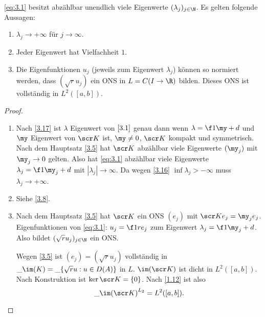 \begin{st} \label{3.19}
	\eqref{eq:3.1} besitzt abzählbar unendlich viele Eigenwerte $(\lambda_j)_{j\in \N}$.
	Es gelten folgende Aussagen:
	\begin{enumerate}[1)]
		\item
			$\lambda_j \to + \infty$ für $j \to \infty$.
		\item
			Jeder Eigenwert hat Vielfachheit $1$.
		\item
			Die Eigenfunktionen $u_j$ (jeweils zum Eigenwert $\lambda_j$) können so normiert werden, dass $(\sqrt {r} u_j)$ ein ONS in $L = C(I \to \R)$ bilden.
			Dieses ONS ist vollständig in $L^2([a,b])$.
	\end{enumerate}
	\begin{proof}
		\begin{enumerate}[1)]
			\item
				Nach \ref{3.17} ist $\lambda$ Eigenwert von $\eqref{3.1}$ genau dann wenn $\lambda = \f 1\my + d$ und $\my$ Eigenwert von $\scr K$ ist, $\my \neq 0$, $\scr K$ kompakt und symmetrisch.
				Nach dem Hauptsatz \ref{3.5} hat $\scr K$ abzählbar viele Eigenwerte $(\my_j)$ mit $\my_j \to 0$ gelten.
				Also hat \eqref{eq:3.1} abzählbar viele Eigenwerte $\lambda_j = \f 1{\my_j} + d$ mit $|\lambda_j| \to \infty$.
				Da wegen \ref{3.16}  $\inf \lambda_j > -\infty$ muss $\lambda_j \to + \infty$.
			\item
				Siehe \ref{3.8}.
			\item
				Nach dem Hauptsatz \ref{3.5} hat $\scr K$ ein ONS $(e_j)$ mit $\scr K e_j = \my_j e_j$.
				Eigenfunktionen von \eqref{eq:3.1}: $u_j = \f 1{r} e_j$ zum Eigenwert $\lambda_j = \f 1{\my_j} + d$.
				Also bildet $(\sqrt{r}u_j)_{j\in \N}$ ein ONS.

				Wegen \ref{3.5} ist $(e_j) = (\sqrt{r} u_j)$ vollständig in $\_{\im (K)} = \_{\{\sqrt{r} u : u  \in D(A) \}}$ in $L$.
				$\im (\scr K)$ ist dicht in $L^2([a,b])$.
				Nach Konstruktion ist $\ker{\scr K}=\{0\}$. Nach \ref{1.12} ist also
				\[
					\_{\im(\scr K)}^{L_2} = L^2 ([a,b]).
				\]
		\end{enumerate}
	\end{proof}
\end{st}

